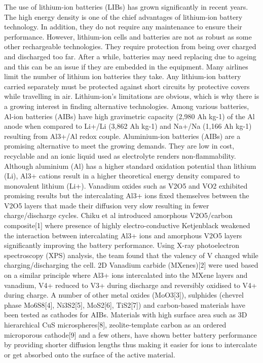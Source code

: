 \documentclass{article}
\begin{document}
The use of lithium-ion batteries (LIBs) has grown significantly in recent years. The high energy density is one of the chief advantages of lithium-ion battery technology. In addition, they do not require any maintenance to ensure their performance. However, lithium-ion cells and batteries are not as robust as some other rechargeable technologies. They require protection from being over charged and discharged too far. After a while, batteries may need replacing due to ageing and this can be an issue if they are embedded in the equipment. Many airlines limit the number of lithium ion batteries they take. Any lithium-ion battery carried separately must be protected against short circuits by protective covers while travelling in air. Lithium-ion’s limitations are obvious, which is why there is a growing interest in finding alternative technologies. Among various batteries, Al-ion batteries (AIBs) have high gravimetric capacity (2,980 Ah kg-1) of the Al anode when compared to Li+/Li (3,862 Ah kg-1) and Na+/Na (1,166 Ah kg-1) resulting from Al3+/Al redox couple. Aluminium-ion batteries (AIBs) are a promising alternative to meet the growing demands. They are low in cost, recyclable and an ionic liquid used as electrolyte renders non-flammability. Although aluminium (Al) has a higher standard oxidation potential than lithium (Li), Al3+ cations result in a higher theoretical energy density compared to monovalent lithium (Li+). Vanadium oxides such as V2O5 and VO2 exhibited promising results but the intercalating Al3+ ions fixed themselves between the V2O5 layers that made their diffusion very slow resulting in fewer charge/discharge cycles. Chiku et al introduced amorphous V2O5/carbon composite[1] where presence of highly electro-conductive Ketjenblack weakened the interaction between intercalating Al3+ ions and amorphous V2O5 layers significantly improving the battery performance. Using X-ray photoelectron spectroscopy (XPS) analysis, the team found that the valency of V changed while charging/discharging the cell. 2D Vanadium carbide (MXenes)[2] were used based on a similar principle where Al3+ ions intercalated into the MXene layers and vanadium, V4+ reduced to V3+ during discharge and reversibly oxidised to V4+ during charge. A number of other metal oxides (MoO3[3]), sulphides (chevrel phase Mo6S8[4], Ni3S2[5], MoS2[6], TiS2[7]) and carbon-based materials have been tested as cathodes for AIBs. Materials with high surface area such as 3D hierarchical CuS microspheres[8], zeolite-template carbon as an ordered microporous cathode[9] and a few others, have shown better battery performance by providing shorter diffusion lengths thus making it easier for ions to intercalate or get absorbed onto the surface of the active material. 
\end{document}
